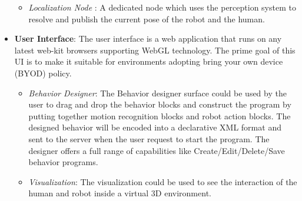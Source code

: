 \documentclass{llncs}
\begin{document}
\begin{itemize}
\begin{itemize}
\item \emph{Localization Node} : A dedicated node which uses the perception system to resolve and publish the current pose of the robot and the human.
\end{itemize}
\item \textbf{User Interface}: The user interface is a web application that runs on any latest web-kit browsers supporting WebGL technology. The prime goal of this UI is to make it suitable for environments adopting bring your own device (BYOD) policy.
\begin{itemize}
\item \emph{Behavior Designer}: The Behavior designer surface could be used by the user to drag and drop the behavior blocks and construct the program by putting together motion recognition blocks and robot action blocks. The designed behavior will be encoded into a declarative XML format and sent to the server when the user request to start the program. The designer offers a full range of capabilities like Create/Edit/Delete/Save behavior programs. 
\item \emph{Visualization}: The visualization could be used to see the interaction of the human and robot inside a virtual 3D environment.
\end{itemize}
\end{itemize}
\end{document}
